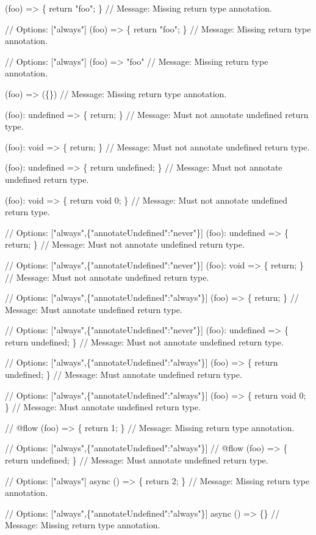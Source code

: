 \begin{DoxyCode}
(foo) => \{ return "foo"; \}
// Message: Missing return type annotation.

// Options: ["always"]
(foo) => \{ return "foo"; \}
// Message: Missing return type annotation.

// Options: ["always"]
(foo) => "foo"
// Message: Missing return type annotation.

(foo) => (\{\})
// Message: Missing return type annotation.

(foo): undefined => \{ return; \}
// Message: Must not annotate undefined return type.

(foo): void => \{ return; \}
// Message: Must not annotate undefined return type.

(foo): undefined => \{ return undefined; \}
// Message: Must not annotate undefined return type.

(foo): void => \{ return void 0; \}
// Message: Must not annotate undefined return type.

// Options: ["always",\{"annotateUndefined":"never"\}]
(foo): undefined => \{ return; \}
// Message: Must not annotate undefined return type.

// Options: ["always",\{"annotateUndefined":"never"\}]
(foo): void => \{ return; \}
// Message: Must not annotate undefined return type.

// Options: ["always",\{"annotateUndefined":"always"\}]
(foo) => \{ return; \}
// Message: Must annotate undefined return type.

// Options: ["always",\{"annotateUndefined":"never"\}]
(foo): undefined => \{ return undefined; \}
// Message: Must not annotate undefined return type.

// Options: ["always",\{"annotateUndefined":"always"\}]
(foo) => \{ return undefined; \}
// Message: Must annotate undefined return type.

// Options: ["always",\{"annotateUndefined":"always"\}]
(foo) => \{ return void 0; \}
// Message: Must annotate undefined return type.

// @flow
(foo) => \{ return 1; \}
// Message: Missing return type annotation.

// Options: ["always",\{"annotateUndefined":"always"\}]
// @flow
 (foo) => \{ return undefined; \}
// Message: Must annotate undefined return type.

// Options: ["always"]
async () => \{ return 2; \}
// Message: Missing return type annotation.

// Options: ["always",\{"annotateUndefined":"always"\}]
async () => \{\}
// Message: Missing return type annotation.


\end{DoxyCode}
